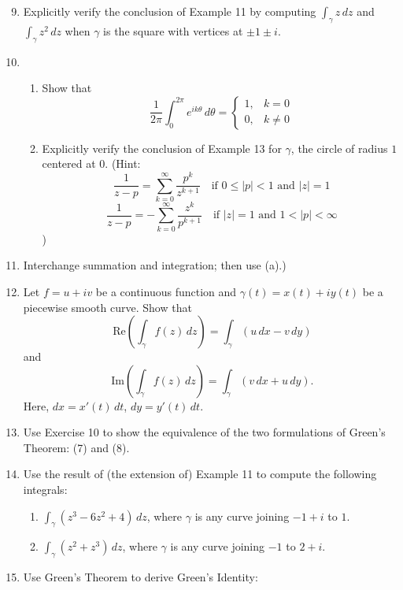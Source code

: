 \documentclass[12pt]{article}
\theoremstyle{definition} %
\theoremstyle{plain} %
\begin{document}
\begin{enumerate}
    \setcounter{enumi}{8}
    \item Explicitly verify the conclusion of Example 11 by computing $\int_\gamma z \, dz$ and $\int_\gamma z^2 \, dz$ when $\gamma$ is the square with vertices at $\pm 1 \pm i$.
    \item 
    \begin{enumerate}
        \item Show that 
        \[
        \frac{1}{2\pi} \int_0^{2\pi} e^{i k \theta} \, d\theta = 
        \begin{cases}
        1, & k = 0 \\
        0, & k \ne 0
        \end{cases}
        \]
        \item Explicitly verify the conclusion of Example 13 for $\gamma$, the circle of radius $1$ centered at $0$. (Hint:
        \[
        \frac{1}{z - p} = \sum_{k = 0}^\infty \frac{p^k}{z^{k + 1}} \quad \text{if } 0 \leq |p| < 1 \text{ and } |z| = 1
        \]
        \[
        \frac{1}{z - p} = -\sum_{k = 0}^\infty \frac{z^k}{p^{k + 1}} \quad \text{if } |z| = 1 \text{ and } 1 < |p| < \infty
        \]
        )
    \end{enumerate}
    \item Interchange summation and integration; then use (a).)
    \item Let $f = u + iv$ be a continuous function and $\gamma(t) = x(t) + i y(t)$ be a piecewise smooth curve. Show that
    \[
    \text{Re} \left( \int_\gamma f(z) \, dz \right) = \int_\gamma (u \, dx - v \, dy)
    \]
    and
    \[
    \text{Im} \left( \int_\gamma f(z) \, dz \right) = \int_\gamma (v \, dx + u \, dy).
    \]
    Here, $dx = x'(t) \, dt$, $dy = y'(t) \, dt$.
    \item Use Exercise 10 to show the equivalence of the two formulations of Green’s Theorem: (7) and (8).
    \item Use the result of (the extension of) Example 11 to compute the following integrals:
    \begin{enumerate}
        \item $\int_\gamma (z^3 - 6z^2 + 4) \, dz$, where $\gamma$ is any curve joining $-1 + i$ to $1$.
        \item $\int_\gamma (z^2 + z^3) \, dz$, where $\gamma$ is any curve joining $-1$ to $2 + i$.
    \end{enumerate}
    \item Use Green’s Theorem to derive Green’s Identity:

\end{enumerate}
\end{document}
